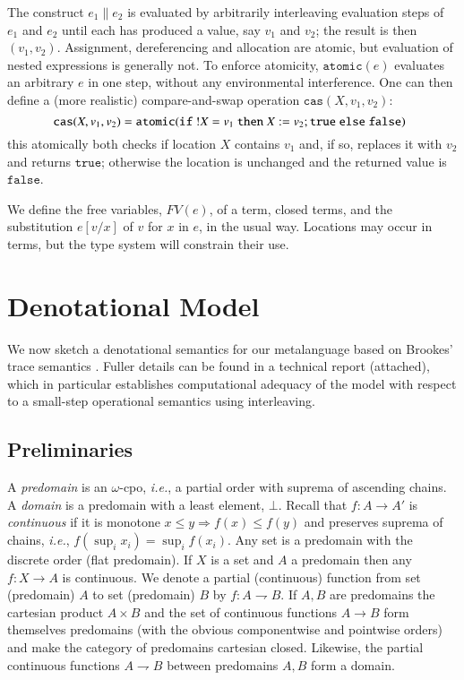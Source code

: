 \documentclass[nocopyrightspace,preprint]{sigplanconf}
\newcommand{\keywd}[1]{\mathtt{#1}}
\newcommand{\myread}[1]{!{#1}}
\newcommand{\FV}{\textit{FV}}
\newcommand{\partfun}{\rightharpoondown}
\newcommand{\mtrue}{\keywd{true}}
\newcommand{\mfalse}{\keywd{false}}
\newcommand{\myatomic}[1]{\keywd{atomic}(#1)}
\newcommand{\cas}[3]{\keywd{cas}( #1, #2, #3)}
\newcommand{\mypar}[2]{#1 \| #2}
\newcommand{\cloc}{\ensuremath{X}\xspace}
\newcommand\ie{\emph{i.e.}\xspace}
\begin{document}
The construct $\mypar{e_1}{e_2}$ is evaluated by arbitrarily
interleaving evaluation steps of $e_1$ and $e_2$
until each has produced a value, say $v_1$ and $v_2$; the result is then
$(v_1,v_2)$. Assignment, dereferencing and allocation are atomic, but
evaluation of nested expressions is generally not.
To enforce atomicity, 
$\myatomic{e}$ evaluates an arbitrary $e$ in one step, without any environmental interference.
One can then define a (more realistic) compare-and-swap operation
$\cas{\cloc}{v_1}{v_2}$:
\[
\hspace{-2mm}
  \cas{\cloc}{v_1}{v_2} = \myatomic{\keywd{if}~\myread{\cloc} = v_1~\keywd{then}~\cloc := v_2; \mtrue~\keywd{else}~\mfalse}
\]
this atomically both checks if location $\cloc$ contains $v_1$ and, if so,
replaces it with $v_2$ and returns $\mtrue$; otherwise the location is unchanged and the returned value is $\mfalse$.


We define the free variables, $\FV(e)$, of a term, closed terms, and
the substitution $e[v/x]$ of $v$ for $x$ in $e$, in the usual
way. Locations may occur in terms, but the type system will
constrain their use.






\section{Denotational Model}\label{values}
We now sketch a denotational semantics for our metalanguage based on
Brookes' trace semantics \cite{brookes96ic}. 
Fuller details can be found in a technical report (attached), which in
particular establishes computational adequacy of the model with
respect to a small-step operational semantics using interleaving.

\subsection{Preliminaries}
A \emph{predomain} is an $\omega$-cpo, \ie, a partial order with
suprema of ascending chains.  A \emph{domain} is a predomain with a
least element, $\bot$.  Recall that $f:A\rightarrow A'$ is
\emph{continuous} if it is monotone $x\leq y \Rightarrow f(x)\leq
f(y)$ and preserves suprema of chains, \ie, $f(\sup_i x_i)=\sup_i
f(x_i)$. Any set is a predomain with the discrete order (flat
predomain). If $X$ is a set and $A$ a predomain then any
$f:X\rightarrow A$ is continuous. We denote a partial (continuous)
function from set (predomain) $A$ to set (predomain) $B$ by $f:A
\partfun B$.
If $A,B$ are predomains the cartesian product $A\times B$ and the set
of continuous functions $A{\rightarrow}B$ form themselves predomains
(with the obvious componentwise and pointwise orders) and make the
category of predomains cartesian closed. Likewise, the partial continuous functions $A{\partfun}B$ between predomains $A, B$ form a domain. 
\end{document}
